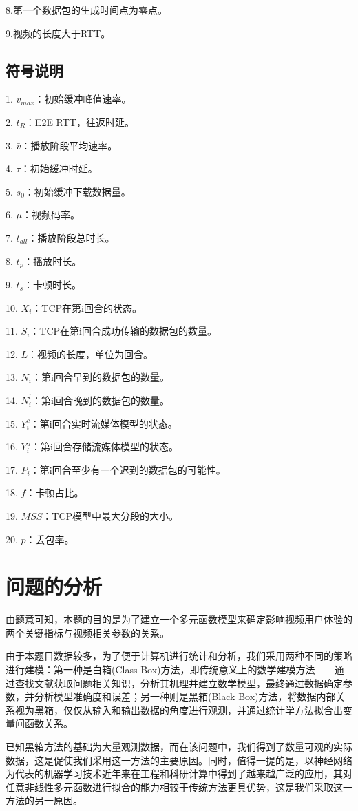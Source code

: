 \documentclass[UTF8]{ctexart}
\begin{document}
8.第一个数据包的生成时间点为零点。

9.视频的长度大于RTT。
\subsection{符号说明}
1. $v_{max} $：初始缓冲峰值速率。

2. $t_{R}$：E2E RTT，往返时延。

3. $ \bar{v} $：播放阶段平均速率。 

4. $ \tau $：初始缓冲时延。

5. $s_{0} $：初始缓冲下载数据量。

6. $\mu $：视频码率。

7. $t_{all} $：播放阶段总时长。

8. $t_{p} $：播放时长。

9. $t_{s} $：卡顿时长。

10. $ X_i $：TCP在第i回合的状态。

11. $ S_i $：TCP在第i回合成功传输的数据包的数量。

12. $ L $：视频的长度，单位为回合。

13. $ N_i$：第i回合早到的数据包的数量。

14. $ N_{i}^l $：第i回合晚到的数据包的数量。

15. $ Y_{i}^c $：第i回合实时流媒体模型的状态。

16. $ Y_{i}^u $：第i回合存储流媒体模型的状态。

17. $ P_i $：第i回合至少有一个迟到的数据包的可能性。

18. $ f$：卡顿占比。

19. $ MSS $：TCP模型中最大分段的大小。

20. $ p $：丢包率。
\section{问题的分析}
由题意可知，本题的目的是为了建立一个多元函数模型来确定影响视频用户体验的两个关键指标与视频相关参数的关系。

由于本题目数据较多，为了便于计算机进行统计和分析，我们采用两种不同的策略进行建模：第一种是白箱(Class Box)方法，即传统意义上的数学建模方法——通过查找文献获取问题相关知识，分析其机理并建立数学模型，最终通过数据确定参数，并分析模型准确度和误差；另一种则是黑箱(Black Box)方法，将数据内部关系视为黑箱，仅仅从输入和输出数据的角度进行观测，并通过统计学方法拟合出变量间函数关系。

已知黑箱方法的基础为大量观测数据，而在该问题中，我们得到了数量可观的实际数据，这是促使我们采用这一方法的主要原因。同时，值得一提的是，以神经网络为代表的机器学习技术近年来在工程和科研计算中得到了越来越广泛的应用，其对任意非线性多元函数进行拟合的能力相较于传统方法更具优势，这是我们采取这一方法的另一原因。
\end{document}
